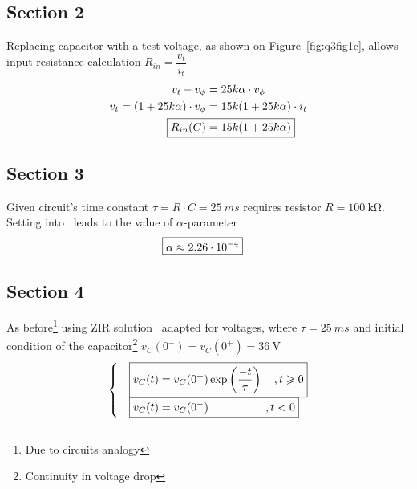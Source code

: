 \documentclass[12pt,a4paper,titlepage]{article}
\makeatletter
\let\reftagform@=\tagform@
\def\tagform@#1{\maketag@@@{(\ignorespaces\textcolor{red}{#1}\unskip\@@italiccorr)}}
\renewcommand{\eqref}[1]{\textup{\reftagform@{\ref{#1}}}}
\makeatother
\begin{document}
{\subsection{Section 2}{
Replacing capacitor with a test voltage, as shown on Figure~\ref{fig:q3fig1c}, allows input resistance calculation $R_{in}=\dfrac{v_t}{i_t}$
\begin{align}
v_t-v_{\phi}&=25k\alpha \cdot v_{\phi} \nonumber \\
v_t=(1+25k\alpha) \cdot v_{\phi}&=15k(1+25k\alpha) \cdot i_t \nonumber \\
\Aboxed{R_{in}(C)&=15k(1+25k\alpha) \label{eq:10}}
\end{align}
}
\subsection{Section 3}{Given circuit's time constant $\tau=R \cdot C=25~\si{ms}$ requires resistor $R=100~\si{\kohm}$. Setting into~\eqref{eq:10} leads to the value of $\alpha$-parameter
\begin{align*}
\Aboxed{\alpha \approx 2.26 \cdot 10^{-4}}
\end{align*}
}
\subsection{Section 4}{As before\footnote{Due to circuits analogy} using ZIR solution~\eqref{eq:7} adapted for voltages, where $\tau=25~\si{ms}$ and initial condition of the capacitor\footnote{Continuity in voltage drop} $v_C(0^-)=v_C(0^+)=36~\si{\volt}$
\begin{align*}
\begin{cases}
\Aboxed{v_C(t)&=v_C(0^+)\exp\left({\dfrac{-t}{\tau}}\right) \quad, t\geqslant0} \\
\Aboxed{v_C(t)&=v_C(0^-) \hspace{5.1em}, t<0} \\
\end{cases}
\end{align*}
}
}\label{sec:q3sec}
\end{document}

